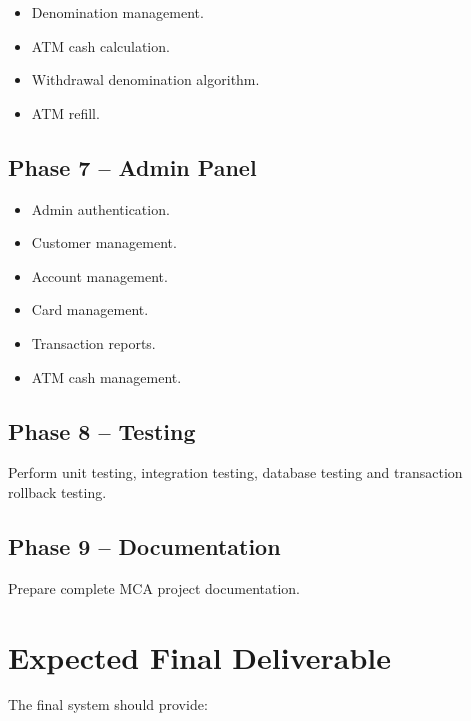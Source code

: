 \documentclass[12pt,a4paper]{article}
\begin{document}
\begin{itemize}
    \item Denomination management.
    \item ATM cash calculation.
    \item Withdrawal denomination algorithm.
    \item ATM refill.
\end{itemize}

\subsection{Phase 7 -- Admin Panel}

\begin{itemize}
    \item Admin authentication.
    \item Customer management.
    \item Account management.
    \item Card management.
    \item Transaction reports.
    \item ATM cash management.
\end{itemize}

\subsection{Phase 8 -- Testing}

Perform unit testing, integration testing, database testing and
transaction rollback testing.

\subsection{Phase 9 -- Documentation}

Prepare complete MCA project documentation.


\section{Expected Final Deliverable}

The final system should provide:
\end{document}
